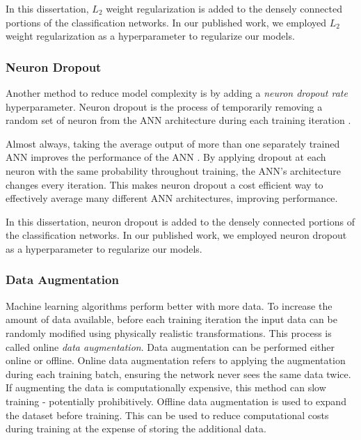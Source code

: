 In this dissertation, $L_2$ weight regularization is added to the densely connected portions of the classification networks. In our published work, we employed $L_2$ weight regularization as a hyperparameter to regularize our models.

\subsubsection{Neuron Dropout}

Another method to reduce model complexity is by adding a \textit{neuron dropout rate} hyperparameter. Neuron dropout is the process of temporarily removing a random set of neuron from the ANN architecture during each training iteration \cite{Srivastava2014}.

Almost always, taking the average output of more than one separately trained ANN improves the performance of the ANN \cite{Srivastava2014}. By applying dropout at each neuron with the same probability throughout training, the ANN's architecture changes every iteration. This makes neuron dropout a cost efficient way to effectively average many different ANN architectures, improving performance. 


In this dissertation, neuron dropout is added to the densely connected portions of the classification networks. In our published work, we employed neuron dropout as a hyperparameter to regularize our models.


\subsubsection{Data Augmentation}

Machine learning algorithms perform better with more data. To increase the amount of data available, before each training iteration the input data can be randomly modified using physically realistic transformations. This process is called online \textit{data augmentation}. Data augmentation can be performed either online or offline. Online data augmentation refers to applying the augmentation during each training batch, ensuring the network never sees the same data twice. If augmenting the data is computationally expensive, this method can slow training - potentially prohibitively. Offline data augmentation is used to expand the dataset before training. This can be used to reduce computational costs during training at the expense of storing the additional data.

